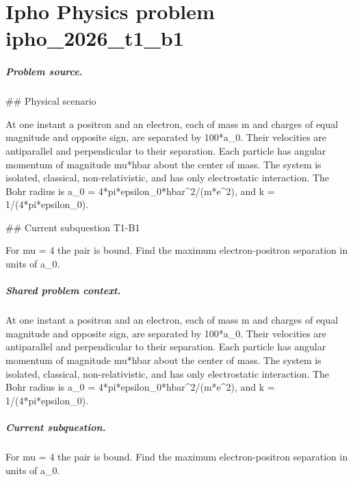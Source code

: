 
\chapter{Ipho Physics problem ipho\_2026\_t1\_b1}
\label{ch:IPhO2026Problems_problem_ipho_2026_t1_b1}

\paragraph{Problem source.}
\#\# Physical scenario

At one instant a positron and an electron, each of mass m and charges of equal
magnitude and opposite sign, are separated by 100*a\_0.  Their velocities are
antiparallel and perpendicular to their separation.  Each particle has angular
momentum of magnitude mu*hbar about the center of mass.  The system is isolated,
classical, non-relativistic, and has only electrostatic interaction.  The Bohr
radius is a\_0 = 4*pi*epsilon\_0*hbar\textasciicircum{}2/(m*e\textasciicircum{}2), and k = 1/(4*pi*epsilon\_0).

\#\# Current subquestion T1-B1

For mu = 4 the pair is bound. Find the maximum electron-positron separation in units of a\_0.

\paragraph{Shared problem context.}
At one instant a positron and an electron, each of mass m and charges of equal
magnitude and opposite sign, are separated by 100*a\_0.  Their velocities are
antiparallel and perpendicular to their separation.  Each particle has angular
momentum of magnitude mu*hbar about the center of mass.  The system is isolated,
classical, non-relativistic, and has only electrostatic interaction.  The Bohr
radius is a\_0 = 4*pi*epsilon\_0*hbar\textasciicircum{}2/(m*e\textasciicircum{}2), and k = 1/(4*pi*epsilon\_0).

\paragraph{Current subquestion.}
For mu = 4 the pair is bound. Find the maximum electron-positron separation in units of a\_0.

